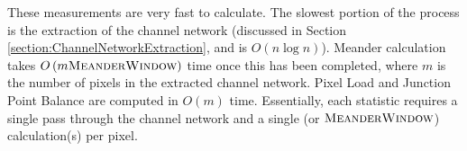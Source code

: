 % 
% 



These measurements are very fast to calculate. The slowest portion of the process is the extraction of the channel network (discussed in Section \ref{section:ChannelNetworkExtraction}, and is $O\left(n \log n\right)$). Meander calculation takes
$O\left( m \textsc{MeanderWindow} \right) $ time once this has been completed, where $m$ is the number of pixels in the extracted channel network. Pixel Load and Junction Point Balance are computed in $O\left(m\right)$ time. Essentially, each statistic requires a single pass through the channel network and a single (or $\textsc{MeanderWindow}$) calculation(s) per pixel.

